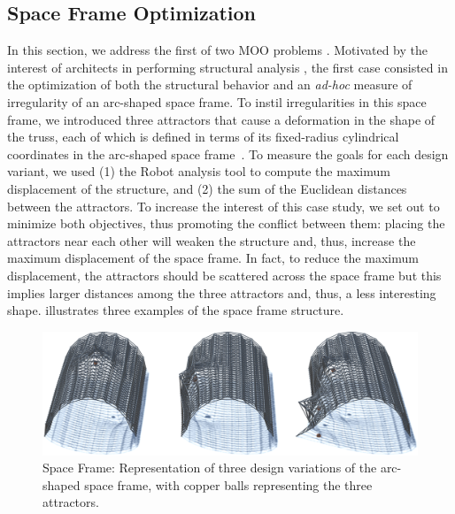 \subsection{Space Frame Optimization}

In this section, we address the first of two \ac{MOO} problems \cite{Belem2019MOO,IP2019MOO}. Motivated by the interest of architects in performing structural analysis \cite{Cichocka2017SURVEY}, the first case consisted in the optimization of both the structural behavior and an \textit{ad-hoc} measure of irregularity of an arc-shaped space frame. To instil irregularities in this space frame, we introduced three attractors that cause a deformation in the shape of the truss, each of which is defined in terms of its fixed-radius cylindrical coordinates in the arc-shaped space frame~\cite{Belem2019MOO}. To measure the goals for each design variant, we used (1) the Robot analysis tool to compute the maximum displacement of the structure, and (2) the sum of the Euclidean distances between the attractors. To increase the interest of this case study, we set out to minimize both objectives, thus promoting the conflict between them: placing the attractors near each other will weaken the structure and, thus, increase the maximum displacement of the space frame. In fact, to reduce the maximum displacement, the attractors should be scattered across the space frame but this implies larger distances among the three attractors and, thus, a less interesting shape.  illustrates three examples of the space frame structure. 

\begin{figure}[htbp]
	\centering
	\includegraphics[width=1\textwidth]{Images/Evaluation/truss-kat-small.png}
	\caption[Space Frame: Representation of three space frame design variants]{Space Frame: Representation of three design variations of the arc-shaped space frame, with copper balls representing the three attractors.}
	\label{fig:spaceframe}
\end{figure}

